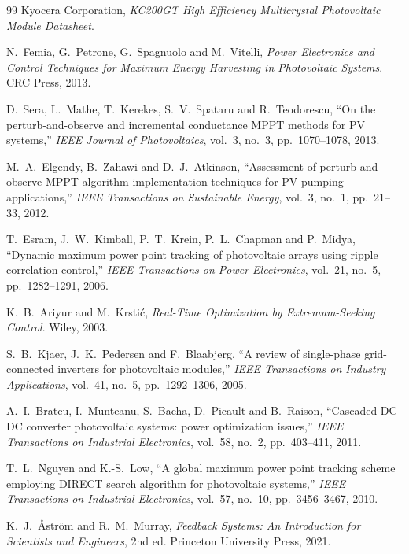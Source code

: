 \documentclass[12pt,a4paper,oneside]{report}
\theoremstyle{definition}
\begin{document}
\begin{thebibliography}{99}
 Kyocera Corporation, \emph{KC200GT High Efficiency Multicrystal Photovoltaic Module Datasheet}.

 N.~Femia, G.~Petrone, G.~Spagnuolo and M.~Vitelli, \emph{Power Electronics and Control Techniques for Maximum Energy Harvesting in Photovoltaic Systems}. CRC Press, 2013.

 D.~Sera, L.~Mathe, T.~Kerekes, S.~V.~Spataru and R.~Teodorescu, ``On the perturb-and-observe and incremental conductance MPPT methods for PV systems,'' \emph{IEEE Journal of Photovoltaics}, vol.~3, no.~3, pp.~1070--1078, 2013.

 M.~A.~Elgendy, B.~Zahawi and D.~J.~Atkinson, ``Assessment of perturb and observe MPPT algorithm implementation techniques for PV pumping applications,'' \emph{IEEE Transactions on Sustainable Energy}, vol.~3, no.~1, pp.~21--33, 2012.

 T.~Esram, J.~W.~Kimball, P.~T.~Krein, P.~L.~Chapman and P.~Midya, ``Dynamic maximum power point tracking of photovoltaic arrays using ripple correlation control,'' \emph{IEEE Transactions on Power Electronics}, vol.~21, no.~5, pp.~1282--1291, 2006.

 K.~B.~Ariyur and M.~Krsti\'{c}, \emph{Real-Time Optimization by Extremum-Seeking Control}. Wiley, 2003.

 S.~B.~Kjaer, J.~K.~Pedersen and F.~Blaabjerg, ``A review of single-phase grid-connected inverters for photovoltaic modules,'' \emph{IEEE Transactions on Industry Applications}, vol.~41, no.~5, pp.~1292--1306, 2005.

 A.~I.~Bratcu, I.~Munteanu, S.~Bacha, D.~Picault and B.~Raison, ``Cascaded DC--DC converter photovoltaic systems: power optimization issues,'' \emph{IEEE Transactions on Industrial Electronics}, vol.~58, no.~2, pp.~403--411, 2011.

 T.~L.~Nguyen and K.-S.~Low, ``A global maximum power point tracking scheme employing DIRECT search algorithm for photovoltaic systems,'' \emph{IEEE Transactions on Industrial Electronics}, vol.~57, no.~10, pp.~3456--3467, 2010.

 K.~J.~{\AA}str\"{o}m and R.~M.~Murray, \emph{Feedback Systems: An Introduction for Scientists and Engineers}, 2nd ed. Princeton University Press, 2021.

\end{thebibliography}
\end{document}
